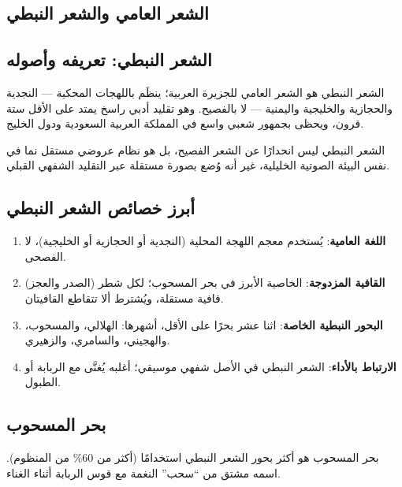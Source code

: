 \begin{otherlanguage}{arabic}

\section*{الشعر العامي والشعر النبطي}

\subsection*{الشعر النبطي: تعريفه وأصوله}

الشعر النبطي هو الشعر العامي للجزيرة العربية؛ ينظَم باللهجات المحكية — النجدية والحجازية والخليجية واليمنية — لا بالفصيح. وهو تقليد أدبي راسخ يمتد على الأقل ستة قرون، ويحظى بجمهور شعبي واسع في المملكة العربية السعودية ودول الخليج.

الشعر النبطي ليس انحدارًا عن الشعر الفصيح، بل هو نظام عروضي مستقل نما في نفس البيئة الصوتية الخليلية، غير أنه وُضع بصورة مستقلة عبر التقليد الشفهي القبلي.

\subsection*{أبرز خصائص الشعر النبطي}

\begin{enumerate}
  \item \textbf{اللغة العامية}: يُستخدم معجم اللهجة المحلية (النجدية أو الحجازية أو الخليجية)، لا الفصحى.
  \item \textbf{القافية المزدوجة}: الخاصية الأبرز في بحر المسحوب؛ لكل شطر (الصدر والعجز) قافية مستقلة، ويُشترط ألا تتقاطع القافيتان.
  \item \textbf{البحور النبطية الخاصة}: اثنا عشر بحرًا على الأقل، أشهرها: الهلالي، والمسحوب، والهجيني، والسامري، والزهيري.
  \item \textbf{الارتباط بالأداء}: الشعر النبطي في الأصل شفهي موسيقي؛ أغلبه يُغنَّى مع الربابة أو الطبول.
\end{enumerate}

\subsection*{بحر المسحوب}

بحر المسحوب هو أكثر بحور الشعر النبطي استخدامًا (أكثر من 60\% من المنظوم). اسمه مشتق من ``سحب'' النغمة مع قوس الربابة أثناء الغناء.


\end{otherlanguage}
